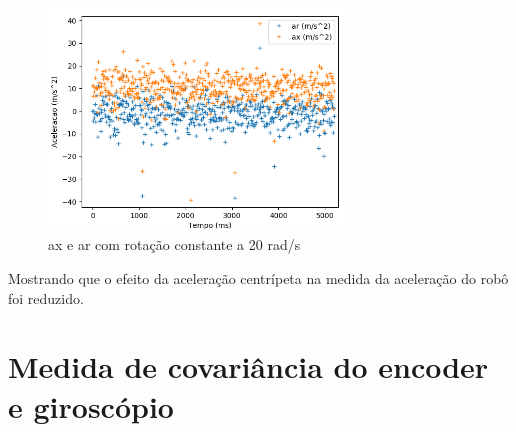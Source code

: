 \documentclass[
	12pt,				%
	openright,			%
	twoside,			%
	convert,
	a4paper,			%
	english,			%
	french,				%
	spanish,			%
	brazil				%
	]{abntex2}
\begin{document}
\begin{figure}[H]
	\caption{ax e ar com rotação constante a 20 rad/s}
\begin{center}
   \includegraphics[width=0.7\textwidth]{acc_ax_ar_fix}
\end{center}
\end{figure}
Mostrando que o efeito da aceleração centrípeta na medida da aceleração do robô foi reduzido.

\section{Medida de covariância do encoder e giroscópio}
\end{document}
